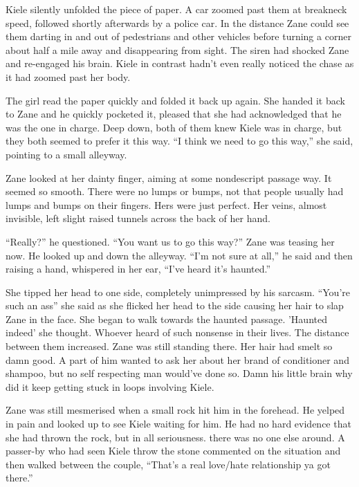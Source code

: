 Kiele silently unfolded the piece of paper.  A car zoomed past them at breakneck speed, followed shortly afterwards by a police car.  In the distance Zane could see them darting in and out of pedestrians and other vehicles before turning a corner about half a mile away and disappearing from sight.  The siren had shocked Zane and re-engaged his brain.  Kiele in contrast hadn't even really noticed the chase as it had zoomed past her body.  

The girl read the paper quickly and folded it back up again.  She handed it back to Zane and he quickly pocketed it, pleased that she had acknowledged that he was the one in charge.  Deep down, both of them knew Kiele was in charge, but they both seemed to prefer it this way.  ``I think we need to go this way,'' she said, pointing to a small alleyway.  

Zane looked at her dainty finger, aiming at some nondescript passage way.  It seemed so smooth.  There were no lumps or bumps, not that people usually had lumps and bumps on their fingers.  Hers were just perfect.  Her veins, almost invisible, left slight raised tunnels across the back of her hand.

``Really?'' he questioned.  ``You want us to go this way?''  Zane was teasing her now.  He looked up and down the alleyway.  ``I'm not sure at all,'' he said and then raising a hand, whispered in her ear, ``I've heard it's haunted.''

She tipped her head to one side, completely unimpressed by his sarcasm.  ``You're such an ass'' she said as she flicked her head to the side causing her hair to slap Zane in the face. She began to walk towards the haunted passage.  'Haunted indeed' she thought.  Whoever heard of such nonsense in their lives.  The distance between them increased.  Zane was still standing there.  Her hair had smelt so damn good.  A part of him wanted to ask her about her brand of conditioner and shampoo, but no self respecting man would've done so.  Damn his little brain why did it keep getting stuck in loops involving Kiele.  

Zane was still mesmerised when a small rock hit him in the forehead.  He yelped in pain and looked up to see Kiele waiting for him.  He had no hard evidence that she had thrown the rock, but in all seriousness. there was no one else around.  A passer-by who had seen Kiele throw the stone commented on the situation and then walked between the couple, ``That's a real love/hate relationship ya got there.''  

